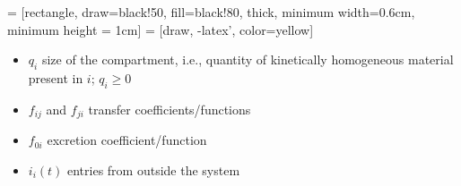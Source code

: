 \documentclass[aspectratio=169]{beamer}\usepackage[]{graphicx}\usepackage[]{xcolor}
\begin{document}
\begin{frame}{}
  \begin{minipage}{0.4\textwidth}
     = [rectangle, 
    draw=black!50, 
    fill=black!80, 
    thick, 
    minimum width=0.6cm,
    minimum height = 1cm]
     = [draw, 
    -latex', 
    color=yellow]
  \end{minipage}
  \begin{minipage}{0.55\textwidth}
    \begin{itemize}
      \item $q_i$ size of the compartment, i.e., quantity of kinetically homogeneous material present in $i$; $q_i\geq 0$
      \item $f_{ij}$ and $f_{ji}$ transfer coefficients/functions
      \item $f_{0i}$ excretion coefficient/function
      \item $i_i(t)$ entries from outside the system
    \end{itemize}
  \end{minipage}
\end{frame}
\end{document}
